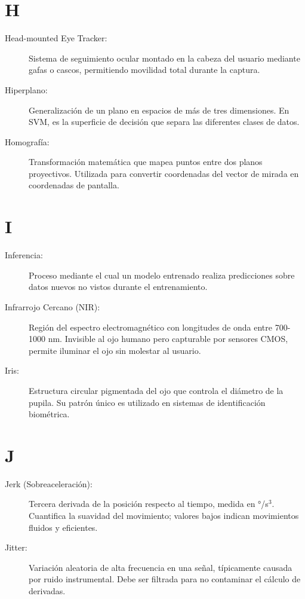 \section*{H}

\begin{description}
    \item[Head-mounted Eye Tracker:] Sistema de seguimiento ocular montado en la cabeza del usuario mediante gafas o cascos, permitiendo movilidad total durante la captura.
    
    \item[Hiperplano:] Generalización de un plano en espacios de más de tres dimensiones. En SVM, es la superficie de decisión que separa las diferentes clases de datos.
    
    \item[Homografía:] Transformación matemática que mapea puntos entre dos planos proyectivos. Utilizada para convertir coordenadas del vector de mirada en coordenadas de pantalla.
\end{description}

\section*{I}

\begin{description}
    \item[Inferencia:] Proceso mediante el cual un modelo entrenado realiza predicciones sobre datos nuevos no vistos durante el entrenamiento.
    
    \item[Infrarrojo Cercano (NIR):] Región del espectro electromagnético con longitudes de onda entre 700-1000 nm. Invisible al ojo humano pero capturable por sensores CMOS, permite iluminar el ojo sin molestar al usuario.
    
    \item[Iris:] Estructura circular pigmentada del ojo que controla el diámetro de la pupila. Su patrón único es utilizado en sistemas de identificación biométrica.
\end{description}

\section*{J}

\begin{description}
    \item[Jerk (Sobreaceleración):] Tercera derivada de la posición respecto al tiempo, medida en °/s$^3$. Cuantifica la suavidad del movimiento; valores bajos indican movimientos fluidos y eficientes.
    
    \item[Jitter:] Variación aleatoria de alta frecuencia en una señal, típicamente causada por ruido instrumental. Debe ser filtrada para no contaminar el cálculo de derivadas.
\end{description}

